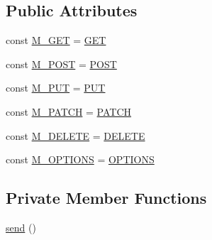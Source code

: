 \subsection*{Public Attributes}
\begin{DoxyCompactItemize}
\item 
const \hyperlink{classlibresignage_1_1api_1_1APIEndpoint_a4e311bd65ee3a851853d55567d4706de}{M\+\_\+\+G\+ET} = \textquotesingle{}\hyperlink{classlibresignage_1_1api_1_1APIEndpoint_ad8fc668e94f2ad8ef6e223e2752e2bd3}{G\+ET}\textquotesingle{}
\item 
const \hyperlink{classlibresignage_1_1api_1_1APIEndpoint_a7c998b0133ffbab696e94e7278559f7d}{M\+\_\+\+P\+O\+ST} = \textquotesingle{}\hyperlink{classlibresignage_1_1api_1_1APIEndpoint_a82763ffe46183716a1fc6bdb28599539}{P\+O\+ST}\textquotesingle{}
\item 
const \hyperlink{classlibresignage_1_1api_1_1APIEndpoint_aefaba0cb4e292122cc0c57a1898a6b9a}{M\+\_\+\+P\+UT} = \textquotesingle{}\hyperlink{classlibresignage_1_1api_1_1APIEndpoint_a2964043ac81d67c7f8009ffe3c23eac4}{P\+UT}\textquotesingle{}
\item 
const \hyperlink{classlibresignage_1_1api_1_1APIEndpoint_ac36f907fa2b04c7621ceb494ade93a0a}{M\+\_\+\+P\+A\+T\+CH} = \textquotesingle{}\hyperlink{classlibresignage_1_1api_1_1APIEndpoint_a25047a0cb7abd12254382ad8c217d80e}{P\+A\+T\+CH}\textquotesingle{}
\item 
const \hyperlink{classlibresignage_1_1api_1_1APIEndpoint_a2e5f30e6e26bf2e758d9dc58a03096e9}{M\+\_\+\+D\+E\+L\+E\+TE} = \textquotesingle{}\hyperlink{classlibresignage_1_1api_1_1APIEndpoint_af6f6859ae46ce52b1801213f6fab41f6}{D\+E\+L\+E\+TE}\textquotesingle{}
\item 
const \hyperlink{classlibresignage_1_1api_1_1APIEndpoint_abd570081c538ce87bab4ecf756c53da9}{M\+\_\+\+O\+P\+T\+I\+O\+NS} = \textquotesingle{}\hyperlink{classlibresignage_1_1api_1_1APIEndpoint_ad75a51aeb94c50be8f17d7867ceaa6a2}{O\+P\+T\+I\+O\+NS}\textquotesingle{}
\end{DoxyCompactItemize}
\subsection*{Private Member Functions}
\begin{DoxyCompactItemize}
\item 
\hyperlink{classlibresignage_1_1api_1_1APIEndpoint_a98f24af170d353cbcbb3d64577641f87}{send} ()
\end{DoxyCompactItemize}
